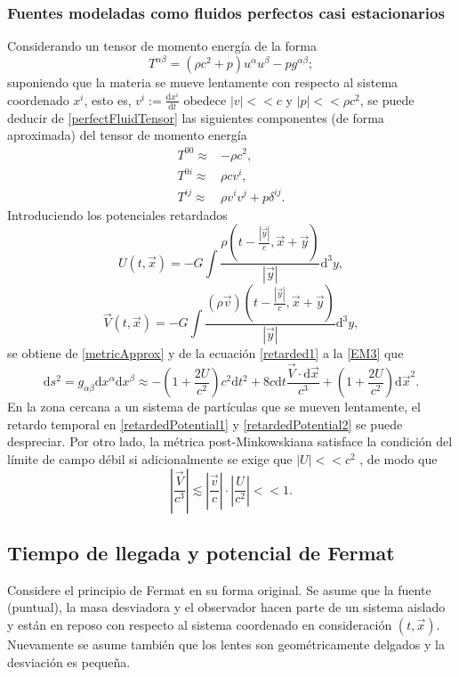 \subsubsection{Fuentes modeladas como fluidos perfectos casi estacionarios}
Considerando un tensor de momento energía de la forma
\begin{equation}\label{perfectFluidTensor}
	T^{\alpha\beta} = (\rho c^2+p)u^\alpha u^\beta-pg^{\alpha\beta};
\end{equation}
suponiendo que la materia se mueve lentamente con respecto al sistema coordenado $x^i$, esto es, $v^i := \frac{\mathrm{d}x^i}{\mathrm{d}t}$ obedece $|v|<<c$ y $|p|<<\rho c^2$, se puede deducir de \eqref{perfectFluidTensor} las siguientes componentes (de forma aproximada) del tensor de momento energía
\begin{align}\label{EM1}
T^{00} \approx& -\rho c^2,\\
\label{EM2}
T^{0i} \approx& \rho c v^i,\\
\label{EM3}
T^{ij} \approx& \rho v^iv^j+p\delta^{ij}.
\end{align}
Introduciendo los potenciales retardados
\begin{equation}\label{retardedPotential1}
U(t,\vec{x})=-G\int\frac{\rho(t-\frac{|\vec{y}|}{c}, \vec{x}+\vec{y})}{|\vec{y}|}\mathrm{d}^3y,
\end{equation}
\begin{equation}\label{retardedPotential2}
	\vec{V}(t,\vec{x}) = -G \int \frac{(\rho\vec{v})(t-\frac{|\vec{y}|}{c}, \vec{x}+\vec{y})}{|\vec{y}|}\mathrm{d}^3y,
\end{equation}
se obtiene de \eqref{metricApprox} y de la ecuación \eqref{retarded1} a la \eqref{EM3} que
\begin{equation}\label{postNewtonianArc}
\mathrm{d}s^2 = g_{\alpha\beta}\mathrm{d}x^\alpha\mathrm{d}x^\beta \approx -\left(1+\frac{2U}{c^2}\right)c^2\mathrm{d}t^2+8c\mathrm{d}t \frac{\vec{V}\cdot \mathrm{d}\vec{x}}{c^3}+\left(1+\frac{2U}{c^2}\right) \mathrm{d}\vec{x}^2.
\end{equation}
En la zona cercana a un sistema de partículas que se mueven lentamente, el retardo temporal en \eqref{retardedPotential1} y \eqref{retardedPotential2} se puede despreciar. Por otro lado, la métrica post-Minkowskiana satisface la condición del límite de campo débil si adicionalmente se exige que $|U|<<c^2$ \cite{schneider_ehlers_falco_1992}, de modo que
$$\left|\frac{\vec{V}}{c^3}\right| \lesssim \left| \frac{\vec{v}}{c}\right| \cdot \left| \frac{U}{c^2} \right|<<1.$$
\subsection{Tiempo de llegada y potencial de Fermat}
Considere el principio de Fermat en su forma original. Se asume que la fuente (puntual), la masa desviadora y el observador hacen parte de un sistema aislado y están en reposo con respecto al sistema coordenado en consideración $(t,\vec{x})$. Nuevamente se asume también que los lentes son geométricamente delgados y la desviación es pequeña.

